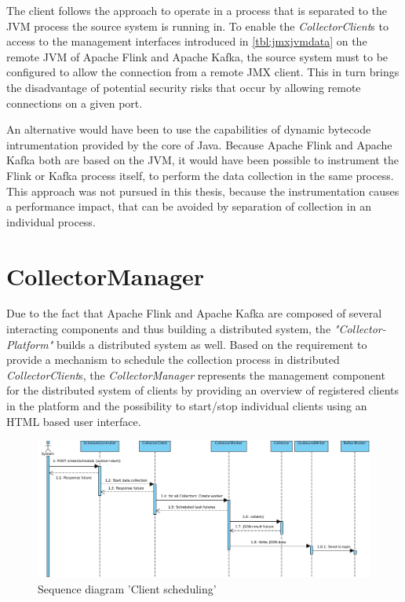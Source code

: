 The client follows the approach to operate in a process that is separated to the JVM process the source system is running in.
To enable the \textit{CollectorClient}s to access to the management interfaces introduced in \autoref{tbl:jmxjvmdata} on the remote JVM
of Apache Flink and Apache Kafka, the source system must to be configured to allow the connection from a remote JMX client. This in turn brings the disadvantage of potential
security risks that occur by allowing remote connections on a given port.

An alternative would have been to use the capabilities of dynamic bytecode intrumentation provided by the core of Java. Because
Apache Flink and Apache Kafka both are based on the JVM, it would have been possible to instrument the Flink or Kafka process itself,
to perform the data collection in the same process. This approach was not pursued in this thesis, because the instrumentation causes
a performance impact, that can be avoided by separation of collection in an individual process.

\section{CollectorManager}
\label{sec:arch-collector-manager}
Due to the fact that Apache Flink and Apache Kafka are composed of several interacting components and thus building
a distributed system, the \textit{"Collector-Platform"} builds a distributed system as well. Based on the requirement to provide a
mechanism to schedule the collection process in distributed \textit{CollectorClient}s, the \textit{CollectorManager} represents the management
component for the distributed system of clients by providing an overview of registered clients in the platform and
the possibility to start/stop individual clients using an HTML based user interface.

\begin{figure}[H]
 	\centering
 	\includegraphics[width=1.0\textwidth]{../uml/sequence-scheduling.jpg}
 	\caption{Sequence diagram 'Client scheduling'}
 	\label{fig:sequence-client-scheduling}
 \end{figure}

